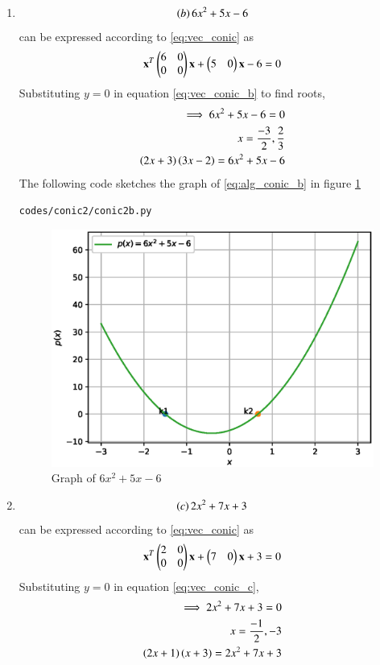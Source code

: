 \begin{enumerate}[label=\thesection.\arabic*.,ref=\thesection.\theenumi]
\item 
\begin{align}
\label{eq:alg_conic_b}
\left(b\right) 6x^{2} + 5x -6
\end{align}
can be expressed according to \ref{eq:vec_conic} as 
\begin{align}
\label{eq:vec_conic_b}
\mathbf{x}^T \begin{pmatrix}6 & 0\\0 & 0\end{pmatrix}\mathbf{x}+ \begin{pmatrix}5 & 0\end{pmatrix}\mathbf{x} -6 =0
\end{align}
Substituting $y=0$ in equation \ref{eq:vec_conic_b} to find roots,
\begin{align}
\implies 
6x^{2}+5x-6=0
\\
x=\frac{-3}{2}, \frac{2}{3}
\\
\left(2x+3\right)\left(3x-2\right)= 6x^{2} + 5x -6
\end{align}
The following code sketches the graph of \ref{eq:alg_conic_b} in figure \ref{fig:conic2b}
\begin{lstlisting}
codes/conic2/conic2b.py
\end{lstlisting}
\begin{figure}[!ht]
\centering
\includegraphics[width=\columnwidth]{./codes/conic2/pyfigs/conic2b.eps}
\caption{Graph of $6x^{2} + 5x -6$}
\label{fig:conic2b}
\end{figure}

\item 
\begin{align}
\label{eq:alg_conic_c}
\left(c\right) 2x^{2} + 7x +3
\end{align}
can be expressed according to \ref{eq:vec_conic} as 
\begin{align}
\label{eq:vec_conic_c}
\mathbf{x}^T \begin{pmatrix}2 & 0\\0 & 0\end{pmatrix}\mathbf{x}+ \begin{pmatrix}7 & 0\end{pmatrix}\mathbf{x} +3 =0
\end{align}
Substituting $y=0$ in equation \ref{eq:vec_conic_c},
\begin{align}
\implies 
2x^{2}+7x+3=0
\\
x=\frac{-1}{2},-3
\\
\left(2x+1\right)\left(x+3\right)= 2x^{2} + 7x +3
\end{align}


\end{enumerate}
